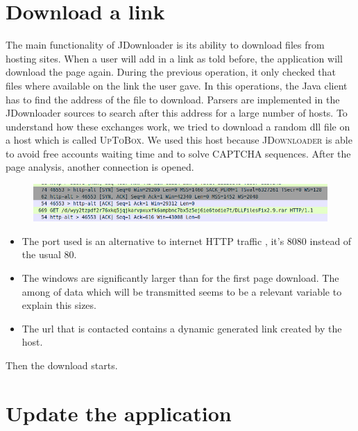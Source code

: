 \documentclass[journal]{IEEEtran}
\begin{document}
\section{Download a link}
The main functionality of JDownloader is its ability to download files from hosting sites. When a user will add in a link as told before, the application will download the page again. During the previous operation, it only checked that files where available on the link the user gave. In this operations, the Java client has to find the address of the file to download. Parsers are implemented in the JDownloader sources to search after this address for a large number of hosts. To understand how these exchanges work, we tried to download a random dll file on a host which is called \textsc{UpToBox}. We used this host because \textsc{JDownloader} is able to avoid free accounts waiting time and to solve CAPTCHA sequences. After the page analysis, another connection is opened. \\
\begin{figure}[ht]
\includegraphics[scale=0.3]{dlLink.png}\\
\end{figure}
\begin{itemize}
\item The port used is an alternative to internet HTTP traffic , it's $8080$ instead of the usual $80$. 
\item The windows are significantly larger than for the first page download. The among of data which will be transmitted seems to be a relevant variable to explain this sizes. 
\item The url that is contacted contains a dynamic generated link created by the host. 
\end{itemize}
Then the download starts. 




\section{Update the application}



\printbibliography

\end{document}
